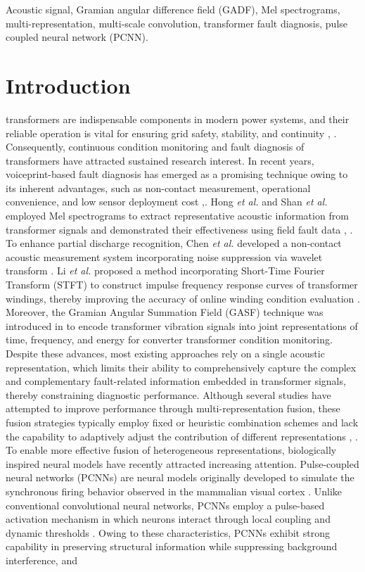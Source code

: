 \documentclass[journal]{IEEEtran}
\begin{document}
\begin{IEEEkeywords}
Acoustic signal, Gramian angular difference field (GADF), Mel spectrograms, multi-representation, multi-scale convolution, transformer fault diagnosis, pulse coupled neural network (PCNN).
\end{IEEEkeywords}

\section{Introduction}
 transformers are indispensable components in modern power systems, and their reliable operation is vital for ensuring grid safety, stability, and continuity \cite{10491111}, \cite{7480687}. Consequently, continuous condition monitoring and fault diagnosis of transformers have attracted sustained research interest. In recent years, voiceprint-based fault diagnosis has emerged as a promising technique owing to its inherent advantages, such as non-contact measurement, operational convenience, and low sensor deployment cost \cite{10492658},\cite{NIU2025127997}. Hong \emph{et al.} and Shan \emph{et al.} employed Mel spectrograms to extract representative acoustic information from transformer signals and demonstrated their effectiveness using field fault data \cite{SHAN2023112408}, \cite{10606641}. To enhance partial discharge recognition, Chen \emph{et al.} developed a non-contact acoustic measurement system incorporating noise suppression via wavelet transform \cite{4265659}. Li \emph{et al.} proposed a method incorporating Short-Time Fourier Transform (STFT) to construct impulse frequency response curves of transformer windings, thereby improving the accuracy of online winding condition evaluation \cite{7558591}. Moreover, the Gramian Angular Summation Field (GASF) technique was introduced in \cite{9760386} to encode transformer vibration signals into joint representations of time, frequency, and energy for converter transformer condition monitoring. Despite these advances, most existing approaches rely on a single acoustic representation, which limits their ability to comprehensively capture the complex and complementary fault-related information embedded in transformer signals, thereby constraining diagnostic performance. Although several studies have attempted to improve performance through multi-representation fusion, these fusion strategies typically employ fixed or heuristic combination schemes and lack the capability to adaptively adjust the contribution of different representations \cite{9408662}, \cite{9832890}. To enable more effective fusion of heterogeneous representations, biologically inspired neural models have recently attracted increasing attention. Pulse-coupled neural networks (PCNNs) are neural models originally developed to simulate the synchronous firing behavior observed in the mammalian visual cortex \cite{4305279,6338347}. Unlike conventional convolutional neural networks, PCNNs employ a pulse-based activation mechanism in which neurons interact through local coupling and dynamic thresholds \cite{8742596}. Owing to these characteristics, PCNNs exhibit strong capability in preserving structural information while suppressing background interference, and 
\end{document}
